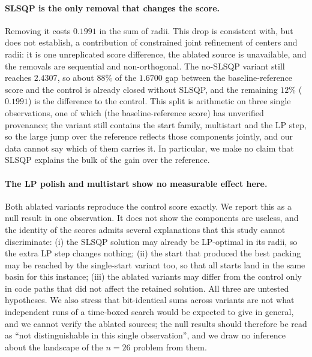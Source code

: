 \documentclass{article} %
\begin{document}
\paragraph{SLSQP is the only removal that changes the score.} Removing it costs $0.1991$ in the sum of radii. This drop is consistent with, but does not establish, a contribution of constrained joint refinement of centers and radii: it is one unreplicated score difference, the ablated source is unavailable, and the removals are sequential and non-orthogonal. The no-SLSQP variant still reaches $2.4307$, so about $88\%$ of the $1.6700$ gap between the baseline-reference score and the control is already closed without SLSQP, and the remaining $12\%$ ($0.1991$) is the difference to the control. This split is arithmetic on three single observations, one of which (the baseline-reference score) has unverified provenance; the variant still contains the start family, multistart and the LP step, so the large jump over the reference reflects those components jointly, and our data cannot say which of them carries it. In particular, we make no claim that SLSQP explains the bulk of the gain over the reference.

\paragraph{The LP polish and multistart show no measurable effect here.} Both ablated variants reproduce the control score exactly. We report this as a null result in one observation. It does not show the components are useless, and the identity of the scores admits several explanations that this study cannot discriminate: (i) the SLSQP solution may already be LP-optimal in its radii, so the extra LP step changes nothing; (ii) the start that produced the best packing may be reached by the single-start variant too, so that all starts land in the same basin for this instance; (iii) the ablated variants may differ from the control only in code paths that did not affect the retained solution. All three are untested hypotheses. We also stress that bit-identical sums across variants are not what independent runs of a time-boxed search would be expected to give in general, and we cannot verify the ablated sources; the null results should therefore be read as ``not distinguishable in this single observation'', and we draw no inference about the landscape of the $n=26$ problem from them.
\end{document}
